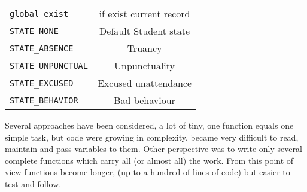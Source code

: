 \begin{shadowblock}{13cm}
\begin{tabular}{lc}
\texttt{global\_exist } & if exist current record\\

\texttt{STATE\_NONE  }& Default Student state\\
\texttt{STATE\_ABSENCE} & Truancy \\
\texttt{STATE\_UNPUNCTUAL}  & Unpunctuality \\
\texttt{STATE\_EXCUSED} & Excused unattendance  \\
\texttt{STATE\_BEHAVIOR } &  Bad behaviour \\

\end{tabular}
\end{shadowblock}

Several approaches have been considered, a lot of tiny, one function equals one simple task, but code were 
growing in complexity, became very difficult to read, maintain and pass variables to them. Other perspective was to write 
only several complete functions which carry all (or almost all) the work. From this point of view functions become longer, 
(up to a hundred of lines of code) but easier to test and follow.

